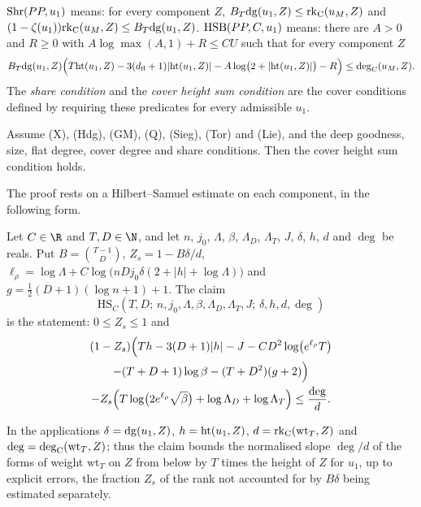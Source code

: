 \begin{definition}\label{pf:lift1:hsat}
$\mathrm{Shr}(PP,u_1)$ means: for every component $Z$,
$B_T\mathrm{dg}(u_1,Z)\le\mathrm{rk}_{\mathrm{C}}(u_M,Z)$ and $(1-\zeta(u_1))\mathrm{rk}_{\mathrm{C}}(u_M,Z)\le B_T\mathrm{dg}(u_1,Z)$.
$\mathrm{HSB}(PP,C,u_1)$ means: there are $A>0$ and $R\ge0$ with $A\log\max(A,1)+R\le CU$ such that for
every component $Z$
\[
B_T\mathrm{dg}(u_1,Z)\Bigl(T\mathrm{ht}(u_1,Z)-3(d_{\mathrm{fl}}+1)|\mathrm{ht}(u_1,Z)|-A\log\bigl(2+|\mathrm{ht}(u_1,Z)|\bigr)-R\Bigr)
\le\mathrm{deg}_{\mathrm{C}}(u_M,Z).
\]
The \emph{share condition} and the \emph{cover height sum condition} are the cover conditions defined
by requiring these predicates for every admissible $u_1$.
\end{definition}

\begin{theorem}\label{pf:lift1:hs-thm}
Assume (X), (Hdg), (GM),
(Q), (Sieg), (Tor) and (Lie), and the deep goodness, size, flat degree, cover degree and share conditions. Then the cover
height sum condition holds.
\end{theorem}

The proof rests on a Hilbert--Samuel estimate on each component, in the following form.

\begin{definition}\label{pf:lift1:claim}
Let $C\in\R$ and $T,D\in\N$, and let $n$, $j_0$, $\Lambda$, $\beta$, $\Lambda_D$, $\Lambda_T$, $J$,
$\delta$, $h$, $d$ and $\deg$ be reals. Put $B=\binom{T-1}D$, $Z_s=1-B\delta/d$,
$\ell_\rho=\log\Lambda+C\log\bigl(nDj_0\delta(2+|h|+\log\Lambda)\bigr)$ and
$g=\frac12(D+1)(\log n+1)+1$. The claim
\[
\mathrm{HS}_C(T,D;\,n,j_0,\Lambda,\beta,\Lambda_D,\Lambda_T,J;\,\delta,h,d,\deg)
\]
is the statement: $0\le Z_s\le1$ and
\begin{multline*}
(1-Z_s)\Bigl(Th-3(D+1)|h|-J-CD^2\log\bigl(e^{\ell_\rho}T\bigr)\\
-(T+D+1)\log\beta-(T+D^2)(g+2)\Bigr)\\
-Z_s\Bigl(T\log\bigl(2e^{\ell_\rho}\sqrt\beta\bigr)+\log\Lambda_D+\log\Lambda_T\Bigr)\le\frac{\deg}d .
\end{multline*}
\end{definition}

In the applications $\delta=\mathrm{dg}(u_1,Z)$, $h=\mathrm{ht}(u_1,Z)$, $d=\mathrm{rk}_{\mathrm{C}}(\mathrm{wt}_T,Z)$ and
$\deg=\mathrm{deg}_{\mathrm{C}}(\mathrm{wt}_T,Z)$; thus the claim bounds the normalised slope $\deg/d$ of the forms of
weight $\mathrm{wt}_T$ on $Z$ from below by $T$ times the height of $Z$ for $u_1$, up to explicit errors,
the fraction $Z_s$ of the rank not accounted for by $B\delta$ being estimated separately.

